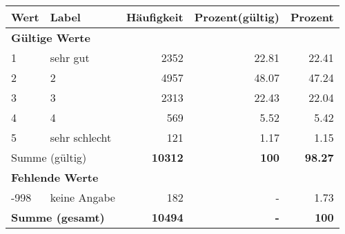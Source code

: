      \begin{longtable}{lXrrr}
     \toprule
     \textbf{Wert} & \textbf{Label} & \textbf{Häufigkeit} & \textbf{Prozent(gültig)} & \textbf{Prozent} \\
     \endhead
     \midrule
     \multicolumn{5}{l}{\textbf{Gültige Werte}}\\

     1 &
     \multicolumn{1}{X}{ sehr gut   } &


       \num{2352} &
       \num[round-mode=places,round-precision=2]{22.81} &
         \num[round-mode=places,round-precision=2]{22.41} \\

     2 &
     \multicolumn{1}{X}{ 2   } &


       \num{4957} &
       \num[round-mode=places,round-precision=2]{48.07} &
         \num[round-mode=places,round-precision=2]{47.24} \\

     3 &
     \multicolumn{1}{X}{ 3   } &


       \num{2313} &
       \num[round-mode=places,round-precision=2]{22.43} &
         \num[round-mode=places,round-precision=2]{22.04} \\

     4 &
     \multicolumn{1}{X}{ 4   } &


       \num{569} &
       \num[round-mode=places,round-precision=2]{5.52} &
         \num[round-mode=places,round-precision=2]{5.42} \\

     5 &
     \multicolumn{1}{X}{ sehr schlecht   } &


       \num{121} &
       \num[round-mode=places,round-precision=2]{1.17} &
         \num[round-mode=places,round-precision=2]{1.15} \\
     \midrule
     \multicolumn{2}{l}{Summe (gültig)} &
       \textbf{\num{10312}} &
     \textbf{\num{100}} &
       \textbf{\num[round-mode=places,round-precision=2]{98.27}} \\
     \multicolumn{5}{l}{\textbf{Fehlende Werte}}\\
       -998 &
       keine Angabe &
         \num{182} &
        - &
         \num[round-mode=places,round-precision=2]{1.73} \\
     \midrule
     \multicolumn{2}{l}{\textbf{Summe (gesamt)}} &
          \textbf{\num{10494}} &
        \textbf{-} &
        \textbf{\num{100}} \\
     \bottomrule
     \end{longtable}
     
